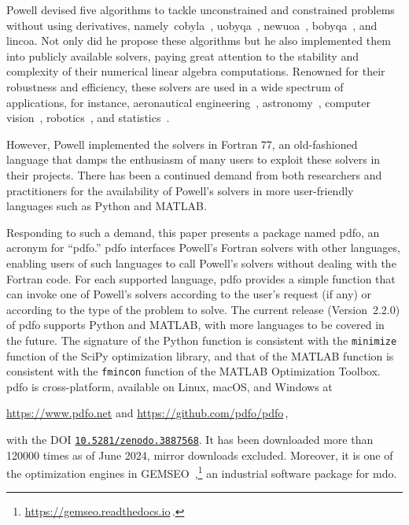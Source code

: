 \documentclass{article}
\numberwithin{equation}{section}
\theoremstyle{definition}
\theoremstyle{plain}
\theoremstyle{remark}
\begin{document}
Powell devised five algorithms to tackle unconstrained and constrained problems without using derivatives, namely~\gls{cobyla}~\cite{Powell_1994}, \gls{uobyqa}~\cite{Powell_2002}, \gls{newuoa}~\cite{Powell_2006}, \gls{bobyqa}~\cite{Powell_2009}, and \gls{lincoa}.
Not only did he propose these algorithms but he also implemented them into publicly available solvers, paying great attention to the stability and complexity of their numerical linear algebra computations.
Renowned for their robustness and efficiency, these solvers are used in a wide spectrum of applications, for instance, aeronautical engineering~\cite{Gallard_Etal_2018}, astronomy~\cite{Mamon_Biviano_Boue_2013}, computer vision~\cite{Izadinia_Shan_Seitz_2017}, robotics~\cite{Mombaur_Truong_Laumond_2010}, and statistics~\cite{Bates_Etal_2015}.

However, Powell implemented the solvers in Fortran 77, an old-fashioned language that damps the enthusiasm of many users to exploit these solvers in their projects.
There has been a continued demand from both researchers and practitioners for the availability of Powell's solvers in more user-friendly languages such as Python and MATLAB.

Responding to such a demand, this paper presents a package named \gls{pdfo}, an acronym for ``\glsdesc{pdfo}.''
\Gls{pdfo} interfaces Powell's Fortran solvers with other languages, enabling users of such languages to call Powell's solvers without dealing with the Fortran code.
For each supported language, \gls{pdfo} provides a simple function that can invoke one of Powell's solvers according to the user's request (if any) or according to the type of the problem to solve.
The current release (Version~2.2.0) of \gls{pdfo} supports Python and MATLAB, with more languages to be covered in the future.
The signature of the Python function is consistent with the \texttt{minimize} function of the SciPy optimization library, and that of the MATLAB function is consistent with the \texttt{fmincon} function of the MATLAB Optimization Toolbox.
\Gls{pdfo} is cross-platform, available on Linux, macOS, and Windows at
\begin{center}
    \url{https://www.pdfo.net} \quad and \quad \url{https://github.com/pdfo/pdfo}\,,
\end{center}
with the DOI \href{https://doi.org/10.5281/zenodo.3887568}{\texttt{10.5281/zenodo.3887568}}.
It has been downloaded more than \num{120000} times as of June 2024, mirror downloads excluded.
Moreover, it is one of the optimization engines in GEMSEO~\cite{Gallard_Etal_2018},\footnote{\url{https://gemseo.readthedocs.io}\,.} an industrial software package for \gls{mdo}.
\end{document}
